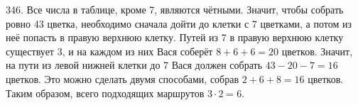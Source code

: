 346. Все числа в таблице, кроме 7, являются чётными. Значит, чтобы собрать ровно 43 цветка, необходимо сначала дойти до клетки с 7 цветками, а потом из неё попасть в правую верхнюю клетку. Путей из 7 в правую верхнюю клетку существует 3, и на каждом из них Вася соберёт $8+6+6=20$ цветков. Значит, на пути из левой нижней клетки до 7 Вася должен собрать $43-20-7=16$ цветков. Это можно сделать двумя способами, собрав $2+6+8=16$ цветков. Таким образом, всего подходящих маршрутов $3\cdot2=6.$\\
